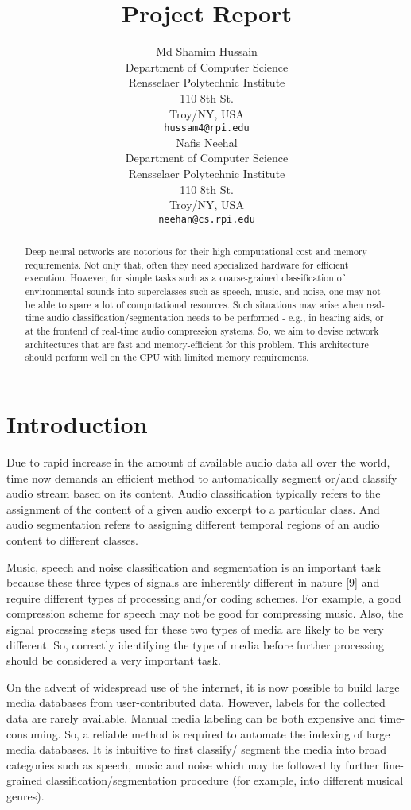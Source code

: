 \documentclass{article}
\title{Project Report}
\author{
Md Shamim Hussain\\
Department of Computer Science\\
Rensselaer Polytechnic Institute\\
110 8th St.\\ Troy/NY, USA\\
\texttt{hussam4@rpi.edu} \\
\And
Nafis Neehal\\
Department of Computer Science\\
Rensselaer Polytechnic Institute\\
110 8th St.\\ Troy/NY, USA\\
\texttt{neehan@cs.rpi.edu} \\
}
\begin{document}
\maketitle

\begin{abstract}
  Deep neural networks are notorious for their high computational cost and memory requirements. Not only that, often they need specialized hardware for efficient execution. However, for simple tasks such as a coarse-grained classification of environmental sounds into superclasses such as speech, music, and noise, one may not be able to spare a lot of computational resources. Such situations may arise when real-time audio classification/segmentation needs to be performed - e.g., in hearing aids, or at the frontend of real-time audio compression systems. So, we aim to devise network architectures that are fast and memory-efficient for this problem. This architecture should perform well on the CPU with limited memory requirements.
\end{abstract}

\section{Introduction}
Due to rapid increase in the amount of available audio data all over the world, time now demands an efficient method to automatically segment or/and classify audio stream based on its content. Audio classification typically refers to the assignment of the content of a given audio excerpt to a particular class. And audio segmentation refers to assigning different temporal regions of an audio content to different classes.  

Music, speech and noise classification and segmentation is an important task because these three types of signals are inherently different in nature [9] and require different types of processing and/or coding schemes. For example, a good compression scheme for speech may not be good for compressing music. Also, the signal processing steps used for these two types of media are likely to be very different. So, correctly identifying the type of media before further processing should be considered a very important task. 

On the advent of widespread use of the internet, it is now possible to build large media databases from user-contributed data. However, labels for the collected data are rarely available. Manual media labeling can be both expensive and time-consuming. So, a reliable method is required to automate the indexing of large media databases. It is intuitive to first classify/ segment the media into broad categories such as speech, music and noise which may be followed by further fine-grained classification/segmentation procedure (for example, into different musical genres). 
\end{document}
